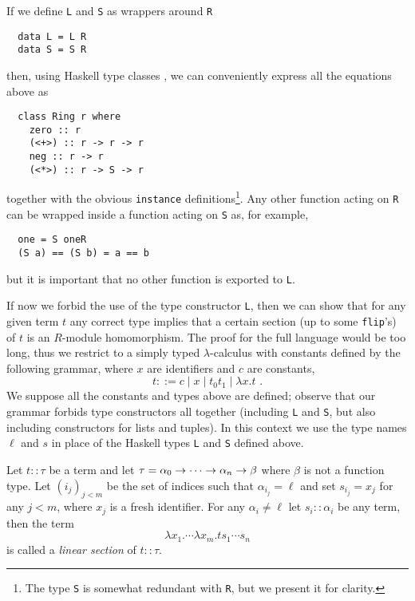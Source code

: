 If we define \lstinline{L} and \lstinline{S} as wrappers around
\lstinline{R}
\begin{lstlisting}
  data L = L R
  data S = S R
\end{lstlisting}
then, using Haskell type classes \cite{WaBl89}, we can conveniently
express all the equations above as
\begin{lstlisting}
  class Ring r where
    zero :: r
    (<+>) :: r -> r -> r
    neg :: r -> r
    (<*>) :: r -> S -> r
\end{lstlisting}
together with the obvious \lstinline{instance}
definitions\footnote{The type \lstinline{S} is somewhat redundant with
  \lstinline{R}, but we present it for clarity.}. Any other function
acting on \lstinline{R} can be wrapped inside a function acting on
\lstinline{S} as, for example,
\begin{lstlisting}
  one = S oneR
  (S a) == (S b) = a == b
\end{lstlisting}
but it is important that no other function is exported to
\lstinline{L}.

If now we forbid the use of the type constructor \lstinline{L}, then
we can show that for any given term $t$ any correct type implies that
a certain section (up to some \lstinline{flip}'s) of $t$ is an
$R$-module homomorphism. The proof for the full language would be too
long, thus we restrict to a simply typed $\lambda$-calculus with
constants defined by the following grammar, where $x$ are identifiers
and $c$ are constants,
\begin{equation}
  \label{eq:lambda}
  t ::= c \;|\; x \;|\; t_0 t_1 \;|\; \lambda x . t  \text{ .}
\end{equation}
We suppose all the constants and types above are defined; observe that
our grammar forbids type constructors all together (including
\lstinline{L} and \lstinline{S}, but also including constructors for
lists and tuples). In this context we use the type names $\ell$ and
$s$ in place of the Haskell types \lstinline{L} and \lstinline{S}
defined above.

\begin{definition}
  Let $t::\tau$ be a term and let
  $\tau=\alpha_0\rightarrow\cdots\rightarrow\alpha_n\rightarrow\beta$ where $\beta$ is not a
  function type. Let $(i_j)_{j<m}$ be the set of indices such that
  $\alpha_{i_j}=\ell$ and set $s_{i_j}=x_j$ for any $j<m$, where $x_j$
  is a fresh identifier.  For any $\alpha_i\ne\ell$ let
  $s_i::\alpha_i$ be any term, then the term
  \begin{equation}
    \lambda x_1.\cdots\lambda x_m.ts_1\cdots s_n
  \end{equation}
  is called a \emph{linear section} of $t::\tau$.
\end{definition}

